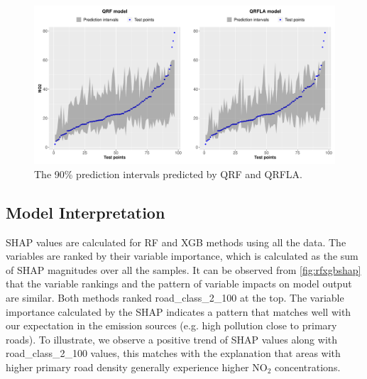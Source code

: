 \documentclass{article}
\begin{document}
 

\begin{figure}[!htb]
\centering
\includegraphics[scale = 0.42]{fig/plot_ml_2.pdf}
\caption{The 90\% prediction intervals predicted by QRF and QRFLA.}
\label{qrrfla}
\end{figure}

\newpage
\subsection{Model Interpretation} 

SHAP values are calculated for RF and XGB methods using all the data. The variables are ranked by their variable importance, which is calculated as the sum of SHAP magnitudes over all the samples. It can be observed from \cref{fig:rfxgbshap} that the variable rankings and the pattern of variable impacts on model output are similar. Both methods ranked road\_class\_2\_100 at the top. The variable importance calculated by the SHAP indicates a pattern that matches well with our expectation in the emission sources (e.g. high pollution close to primary roads). To illustrate, we observe a positive trend of SHAP values along with road\_class\_2\_100 values, this matches with the explanation that areas with higher primary road density generally experience higher NO$_2$ concentrations.
\end{document}
